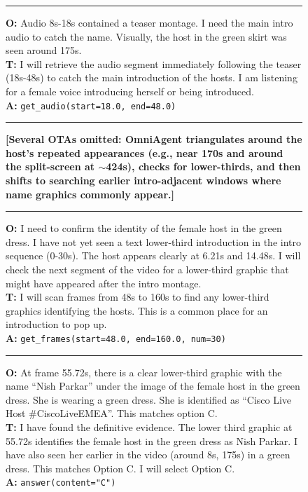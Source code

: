 \documentclass{article}
\theoremstyle{plain}
\theoremstyle{definition}
\theoremstyle{remark}
\begin{document}
\begin{figure}[!ht]
\begin{minipage}{0.95\textwidth}
    \vspace{0.2em}\hrule\vspace{0.2em}

    \textbf{O:} Audio 8s-18s contained a teaser montage. I need the main intro audio to catch the name. Visually, the host in the green skirt was seen around 175s.\\
    \textbf{T:} I will retrieve the audio segment immediately following the teaser (18s-48s) to catch the main introduction of the hosts. I am listening for a female voice introducing herself or being introduced.\\
    \textbf{A:} \texttt{get\_audio(start=18.0, end=48.0)}

    \vspace{0.2em}\hrule\vspace{0.2em}

    \textbf{[Several OTAs omitted: OmniAgent triangulates around the host's repeated appearances (e.g., near 170s and around the split-screen at $\sim$424s), checks for lower-thirds, and then shifts to searching earlier intro-adjacent windows where name graphics commonly appear.]}

    \vspace{0.2em}\hrule\vspace{0.2em}

    \textbf{O:} I need to confirm the identity of the female host in the green dress. I have not yet seen a text lower-third introduction in the intro sequence (0-30s). The host appears clearly at 6.21s and 14.48s. I will check the next segment of the video for a lower-third graphic that might have appeared after the intro montage.\\
    \textbf{T:} I will scan frames from 48s to 160s to find any lower-third graphics identifying the hosts. This is a common place for an introduction to pop up.\\
    \textbf{A:} \texttt{get\_frames(start=48.0, end=160.0, num=30)}

    \vspace{0.2em}\hrule\vspace{0.2em}

    \textbf{O:} At frame 55.72s, there is a clear lower-third graphic with the name ``Nish Parkar'' under the image of the female host in the green dress. She is wearing a green dress. She is identified as ``Cisco Live Host \#CiscoLiveEMEA''. This matches option C.\\
    \textbf{T:} I have found the definitive evidence. The lower third graphic at 55.72s identifies the female host in the green dress as Nish Parkar. I have also seen her earlier in the video (around 8s, 175s) in a green dress. This matches Option C. I will select Option C.\\
    \textbf{A:} \texttt{answer(content="C")}


\end{minipage}
\end{figure}
\end{document}
